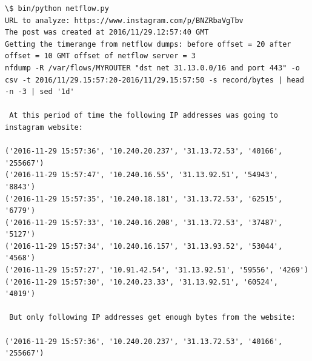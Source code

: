 \begin{lstlisting}
\$ bin/python netflow.py 
URL to analyze: https://www.instagram.com/p/BNZRbaVgTbv
The post was created at 2016/11/29.12:57:40 GMT
Getting the timerange from netflow dumps: before offset = 20 after offset = 10 GMT offset of netflow server = 3
nfdump -R /var/flows/MYROUTER "dst net 31.13.0.0/16 and port 443" -o csv -t 2016/11/29.15:57:20-2016/11/29.15:57:50 -s record/bytes | head -n -3 | sed '1d'

 At this period of time the following IP addresses was going to instagram website: 

('2016-11-29 15:57:36', '10.240.20.237', '31.13.72.53', '40166', '255667')
('2016-11-29 15:57:47', '10.240.16.55', '31.13.92.51', '54943', '8843')
('2016-11-29 15:57:35', '10.240.18.181', '31.13.72.53', '62515', '6779')
('2016-11-29 15:57:33', '10.240.16.208', '31.13.72.53', '37487', '5127')
('2016-11-29 15:57:34', '10.240.16.157', '31.13.93.52', '53044', '4568')
('2016-11-29 15:57:27', '10.91.42.54', '31.13.92.51', '59556', '4269')
('2016-11-29 15:57:30', '10.240.23.33', '31.13.92.51', '60524', '4019')

 But only following IP addresses get enough bytes from the website: 

('2016-11-29 15:57:36', '10.240.20.237', '31.13.72.53', '40166', '255667')

\end{lstlisting}
